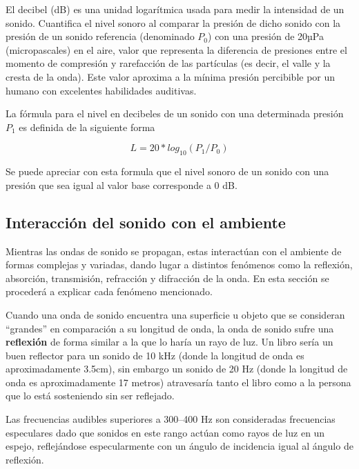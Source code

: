 \documentclass{prgrado}
\begin{document}
El decibel (dB) es una unidad logarítmica usada para medir la intensidad de un sonido. Cuantifica el nivel sonoro al comparar la presión de dicho sonido con la presión de un sonido referencia (denominado $P_0$) con una presión de 20µPa (micropascales) en el aire, valor que representa la diferencia de presiones entre el momento de compresión y rarefacción de las partículas (es decir, el valle y la cresta de la onda). Este valor aproxima a la mínima presión percibible por un humano con excelentes habilidades auditivas.

La fórmula para el nivel en decibeles de un sonido con una determinada presión $P_1$ es definida de la siguiente forma

\begin{equation}
L = 20 * log_{10}(P_1/P_0)
\end{equation}

Se puede apreciar con esta formula que el nivel sonoro de un sonido con una presión que sea igual al
valor base corresponde a 0 dB.

\subsection{Interacción del sonido con el ambiente}

Mientras las ondas de sonido se propagan, estas interactúan con el ambiente de formas complejas y variadas, dando lugar a distintos fenómenos como la reflexión, absorción, transmisión, refracción y difracción de la onda. En esta sección se procederá a explicar cada fenómeno mencionado.

Cuando una onda de sonido encuentra una superficie u objeto que se consideran “grandes” en comparación a su longitud de onda, la onda de sonido sufre una \textbf{reflexión} de forma similar a la que lo haría un rayo de luz. Un libro sería un buen reflector para un sonido de 10 kHz (donde la longitud de onda es aproximadamente 3.5cm), sin embargo un sonido de 20 Hz (donde la longitud de onda es aproximadamente 17 metros) atravesaría tanto el libro como a la persona que lo está sosteniendo sin ser reflejado.

Las frecuencias audibles superiores a 300–400 Hz son consideradas frecuencias especulares \cite{Everest} dado que sonidos en este rango actúan como rayos de luz en un espejo, reflejándose especularmente con un ángulo de incidencia igual al ángulo de reflexión.
\end{document}
